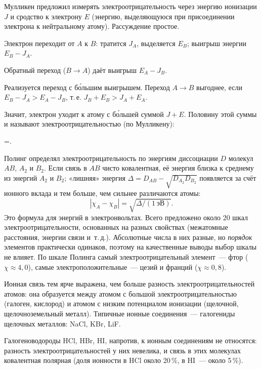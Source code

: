 Мулликен предложил измерять электроотрицательность через энергию
ионизации $J$ и сродство к электрону $E$ (энергию, выделяющуюся при
присоединении электрона к нейтральному атому). Рассуждение простое.
\begin{shagi}
\item Электрон переходит от $A$ к $B$: тратится $J_A$, выделяется $E_B$;
выигрыш энергии $E_B-J_A$.
\item Обратный переход ($B\to A$) даёт выигрыш $E_A-J_B$.
\item Реализуется переход с б\'ольшим выигрышем. Переход $A\to B$ выгоднее,
если $E_B-J_A>E_A-J_B$, т.\,е. $J_B+E_B>J_A+E_A$.
\end{shagi}
Значит, электрон уходит к атому с б\'ольшей суммой $J+E$. Половину этой
суммы и называют электроотрицательностью (по Мулликену):
\begin{keyeq}\label{eq:mulliken}
\chi=.
\end{keyeq}

Полинг определял электроотрицательность по энергиям диссоциации $D$
молекул $AB$, $A_2$ и $B_2$. Если связь в $AB$ чисто ковалентная, её
энергия близка к среднему из энергий $A_2$ и $B_2$; «лишняя» энергия
$\Delta=D_{AB}-\sqrt{D_{A_2}D_{B_2}}$ появляется за счёт ионного вклада и
тем больше, чем сильнее различаются атомы:
\begin{equation}\label{eq:pauling}
|\chi_A-\chi_B|=\sqrt{\Delta/(1~\text{эВ})}.
\end{equation}
Это формула для энергий в электронвольтах. Всего предложено около 20 шкал
электроотрицательности, основанных на разных свойствах (межатомные
расстояния, энергии связи и~т.\,д.). Абсолютные числа в них разные, но
\emph{порядок} элементов практически одинаков, поэтому на качественные
выводы выбор шкалы не влияет. По шкале Полинга самый
электроотрицательный элемент~— фтор ($\chi\approx4{,}0$), самые
электроположительные~— цезий и франций ($\chi\approx0{,}8$).

\begin{glavnoe}
Ионная связь тем ярче выражена, чем больше разность
электроотрицательностей атомов: она образуется между атомом с большой
электроотрицательностью (галоген, кислород) и атомом с низким
потенциалом ионизации (щелочной, щелочноземельный металл). Типичные
ионные соединения~— галогениды щелочных металлов: NaCl, KBr, LiF.
\end{glavnoe}
Галогеноводороды HCl, HBr, HI, напротив, к ионным соединениям не
относятся: разность электроотрицательностей у них невелика,
и связь в этих молекулах ковалентная полярная (доля ионности в HCl около
20\,\%, в HI~— около 5\,\%).


